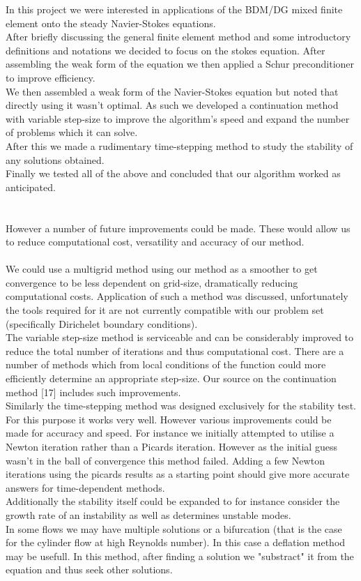 \documentclass[11pt,twoside,a4paper]{article}
\begin{document}
In this project we were interested in applications of the BDM/DG mixed finite element onto the steady Navier-Stokes equations.\\
After briefly discussing the general finite element method and some introductory definitions and notations we decided to focus on the stokes equation. After assembling the weak form of the equation we then applied a Schur preconditioner to  improve efficiency.\\
We then assembled a weak form of the Navier-Stokes equation but noted that directly using it wasn't optimal. As such we developed a continuation method with variable step-size to improve the algorithm's speed and expand the number of problems which it can solve.\\
After this we made a rudimentary time-stepping method to study the stability of any solutions obtained.\\
Finally we tested all of the above and concluded that our algorithm worked as anticipated.\\
\\
\\
However a number of future improvements could be made.
These would allow us to reduce computational cost, versatility and accuracy of our method.\\
\\
We could use a multigrid method using our method as a smoother to get convergence to be less dependent on grid-size, dramatically reducing computational costs. Application of such a method was discussed, unfortunately the tools required for it are not currently compatible with our problem set (specifically Dirichelet boundary conditions).\\
The variable step-size method is serviceable and can be considerably improved to reduce the total number of iterations and thus computational cost. There are a number of methods which from local conditions of the function could more efficiently determine an appropriate step-size. Our source on the continuation method [17] includes such improvements.\\
Similarly the time-stepping method was designed exclusively for the stability test. For this purpose it works very well. However various improvements could be made for accuracy and speed. For instance we initially attempted to utilise a Newton iteration rather than a Picards iteration. However as the initial guess wasn't in the ball of convergence this method failed. Adding a few Newton iterations using the picards results as a starting point should give more accurate answers for time-dependent methods.\\
Additionally the stability itself could be expanded to for instance consider the growth rate of an instability as well as determines unstable modes.\\
In some flows we may have multiple solutions or a bifurcation (that is the case for the cylinder flow at high Reynolds number). In this case a deflation method may be usefull. In this method, after finding a solution we "substract" it from the equation and thus seek other solutions.\\
\\
\end{document}
